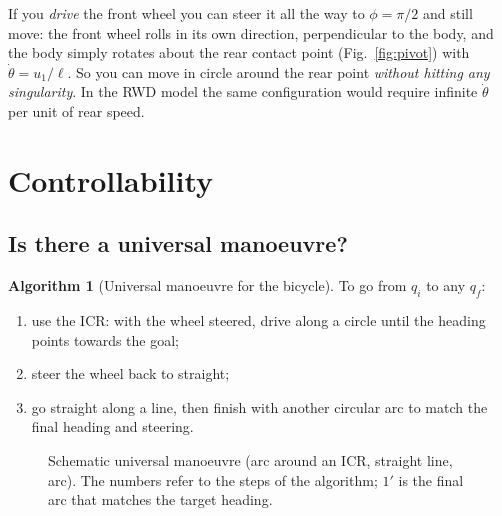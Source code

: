 \documentclass[11pt,a4paper]{article}
\newcommand{\wheel}[3]{\begin{scope}[shift={#1},rotate=#2]
  \draw[fill=#3,rounded corners=1pt] (-0.4,-0.12) rectangle (0.4,0.12);\end{scope}}
\theoremstyle{definition}
\newtheorem{algorithm}[definition]{Algorithm}
\theoremstyle{plain}
\theoremstyle{remark}
\begin{document}
\begin{intuition}
If you \emph{drive} the front wheel you can steer it all the way to $\phi=\pi/2$ and still move: the front wheel rolls in its own direction, perpendicular to the body, and the body simply rotates about the rear contact point (Fig.~\ref{fig:pivot}) with $\dot\theta=u_1/\ell$. So you can move in circle around the rear point \emph{without hitting any singularity}. In the RWD model the same configuration would require infinite $\dot\theta$ per unit of rear speed.
\end{intuition}

\section{Controllability}

\subsection{Is there a universal manoeuvre?}

\begin{algorithm}[Universal manoeuvre for the bicycle]
To go from $q_i$ to any $q_f$:
\begin{enumerate}[label=(\arabic*)]
\item use the ICR: with the wheel steered, drive along a circle until the heading points towards the goal;
\item steer the wheel back to straight;
\item go straight along a line, then finish with another circular arc to match the final heading and steering.
\end{enumerate}
\end{algorithm}

\begin{figure}[H]
\centering
{}
\caption{Schematic universal manoeuvre (arc around an ICR, straight line, arc). The numbers refer to the steps of the algorithm; $1'$ is the final arc that matches the target heading.}
\end{figure}
\end{document}
